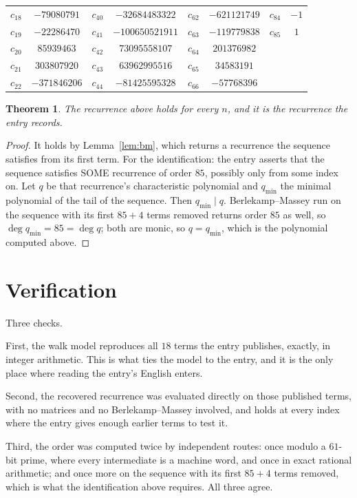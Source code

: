 \documentclass[11pt,a4paper]{article}
\theoremstyle{plain}
\newtheorem{theorem}{Theorem}
\theoremstyle{definition}
\begin{document}
\begin{center}
\begin{tabular}{cccccccc}
$c_{18}$ & $-79080791$ & $c_{40}$ & $-32684483322$ & $c_{62}$ & $-621121749$ & $c_{84}$ & $-1$ \\
$c_{19}$ & $-22286470$ & $c_{41}$ & $-100650521911$ & $c_{63}$ & $-119779838$ & $c_{85}$ & $1$ \\
$c_{20}$ & $85939463$ & $c_{42}$ & $73095558107$ & $c_{64}$ & $201376982$ &  &  \\
$c_{21}$ & $303807920$ & $c_{43}$ & $63962995516$ & $c_{65}$ & $34583191$ &  &  \\
$c_{22}$ & $-371846206$ & $c_{44}$ & $-81425595328$ & $c_{66}$ & $-57768396$ &  &  \\
\end{tabular}
\end{center}

\begin{theorem}
The recurrence above holds for every $n$, and it is the recurrence the entry records.
\end{theorem}

\begin{proof}
It holds by Lemma~\ref{lem:bm}, which returns a recurrence the sequence satisfies from its
first term. For the identification: the entry asserts that the sequence satisfies SOME
recurrence of order $85$, possibly only from some index on. Let $q$ be that recurrence's
characteristic polynomial and $q_{\min}$ the minimal polynomial of the tail of the sequence.
Then $q_{\min}\mid q$. Berlekamp--Massey run on the sequence with its first $85+4$ terms
removed returns order $85$ as well, so $\deg q_{\min}=85=\deg q$; both are monic, so
$q=q_{\min}$, which is the polynomial computed above.
\end{proof}

\section{Verification}

Three checks.

First, the walk model reproduces all $18$ terms the entry publishes, exactly, in integer
arithmetic. This is what ties the model to the entry, and it is the only place where reading
the entry's English enters.

Second, the recovered recurrence was evaluated directly on those published terms, with no
matrices and no Berlekamp--Massey involved, and holds at every index where the entry gives
enough earlier terms to test it.

Third, the order was computed twice by independent routes: once modulo a $61$-bit prime, where
every intermediate is a machine word, and once in exact rational arithmetic; and once more on
the sequence with its first $85+4$ terms removed, which is what the identification above
requires. All three agree.
\end{document}
